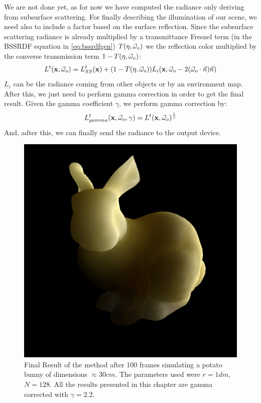 We are not done yet, as for now we have computed the radiance only deriving from subsurface scattering. For finally describing the illumination of our scene, we need also to include a factor based on the surface reflection. Since the subsurface scattering radiance is already multiplied by a transmittance Fresnel term (in the BSSRDF equation in \ref{eq:bssrdfgen}) $T(\eta,\vec{\omega}_o)$ we the reflection color multiplied by the converse transmission term $1 - T(\eta,\vec{\omega}_o)$:
$$
L^t(\mathbf{x}, \vec{\omega}_o) = L_{SS}^t(\mathbf{x}) + (1 - T(\eta,\vec{\omega}_o)) L_i(\mathbf{x}, \vec{\omega}_o - 2 (\vec{\omega}_o \cdot \vec{n}) \vec{n})
$$
$L_i$ can be the radiance coming from other objects or by an environment map. After this, we just need to perform gamma correction in order to get the final result. Given the gamma coefficient $\gamma$, we perform gamma correction by:
$$
L_{gamma}^t(\mathbf{x}, \vec{\omega}_o, \gamma) = L^t(\mathbf{x},\vec{\omega}_o)^{\frac{1}{\gamma}}
$$
And, adter this, we can finally send the radiance to the output device.
\begin{figure}[!ht]
\centering
\includegraphics[width=0.8 \linewidth]{images/results/potato_100_convergence.png}
\caption{Final Result of the method after 100 frames simulating a potato bunny of dimensions $\approx 30 cm$. The parameters used were $r = 1 dm$, $N = 128$. All the results presented in this chapter are gamma corrected with $\gamma = 2.2$.}
\label{fig:potato_result}
\end{figure} 
